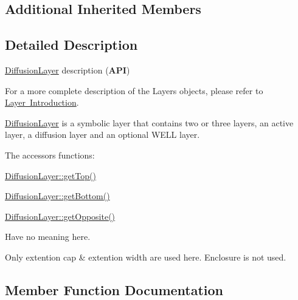 \subsection*{Additional Inherited Members}


\subsection{Detailed Description}
\mbox{\hyperlink{classHurricane_1_1DiffusionLayer}{Diffusion\+Layer}} description ({\bfseries A\+PI}) 

For a more complete description of the Layers objects, please refer to \mbox{\hyperlink{classHurricane_1_1Layer_secLayerIntro}{Layer Introduction}}.

\mbox{\hyperlink{classHurricane_1_1DiffusionLayer}{Diffusion\+Layer}} is a symbolic layer that contains two or three layers, an active layer, a diffusion layer and an optional W\+E\+LL layer.

The accessors functions\+: 
\begin{DoxyItemize}
\item \mbox{\hyperlink{classHurricane_1_1Layer_a5f7c43a29f3dd02a9ebccbcbf91d6727}{Diffusion\+Layer\+::get\+Top()}} 
\item \mbox{\hyperlink{classHurricane_1_1Layer_a4dab4552a219d2d900ed0b1245dc6580}{Diffusion\+Layer\+::get\+Bottom()}} 
\item \mbox{\hyperlink{classHurricane_1_1Layer_a69e76c09a56260169c4f5c145a35a47f}{Diffusion\+Layer\+::get\+Opposite()}} 
\end{DoxyItemize}Have no meaning here.

Only extention cap \& extention width are used here. Enclosure is not used. 

\subsection{Member Function Documentation}
\mbox{\label{classHurricane_1_1DiffusionLayer_a91b5f8a20b005c20b4b9b9080250939e}} 

